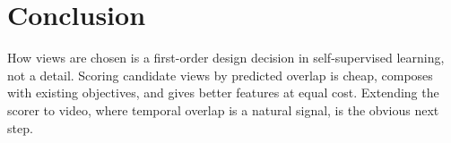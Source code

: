 \chapter{Conclusion}
\label{ch:conclusion}

How views are chosen is a first-order design decision in self-supervised learning, not a detail.
Scoring candidate views by predicted overlap is cheap, composes with existing objectives, and
gives better features at equal cost. Extending the scorer to video, where temporal overlap is a
natural signal, is the obvious next step.
